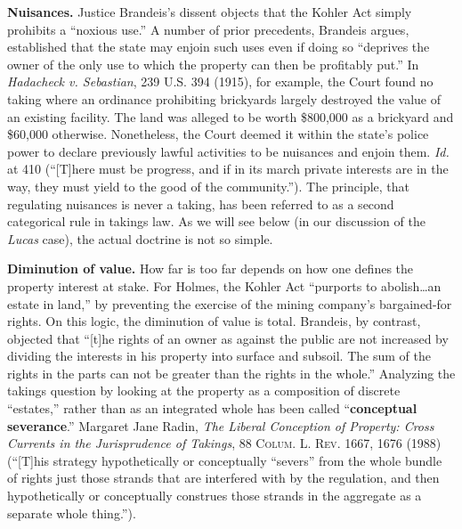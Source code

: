 
\item \textbf{Nuisances.} Justice Brandeis's dissent objects that the Kohler Act
simply prohibits a ``noxious use.'' A number of prior precedents, Brandeis
argues, established that the state may enjoin such uses even if doing so
``deprives the owner of the only use to which the property can then be
profitably put.'' In \textit{Hadacheck v. Sebastian}, 239 U.S. 394 (1915), for
example, the Court found no taking where an ordinance prohibiting brickyards
largely destroyed the value of an existing facility. The land was alleged to be
worth \$800,000 as a brickyard and \$60,000 otherwise. Nonetheless, the Court
deemed it within the state's police power to declare previously lawful
activities to be nuisances and enjoin them. \textit{Id.} at 410 (``[T]here must
be progress, and if in its march private interests are in the way, they must
yield to the good of the community.''). The principle, that regulating nuisances
is never a taking, has been referred to as a second categorical rule in takings
law. As we will see below (in our discussion of the \textit{Lucas} case), the
actual doctrine is not so simple.

\item \textbf{Diminution of value.} How far is too far depends on how one
defines the property interest at stake. For Holmes, the Kohler Act ``purports to
abolish\ldots an estate in land,'' by preventing the exercise of the mining
company's bargained-for rights. On this logic, the diminution of value is total.
Brandeis, by contrast, objected that ``[t]he rights of an owner as against the
public are not increased by dividing the interests in his property into surface
and subsoil. The sum of the rights in the parts can not be greater than the
rights in the whole.'' Analyzing the takings question by looking at the property
as a composition of discrete ``estates,'' rather than as an integrated whole has
been called ``\textbf{conceptual severance}.'' Margaret Jane Radin, \textit{The
Liberal Conception of Property: Cross Currents in the Jurisprudence of Takings},
88 \textsc{Colum. L. Rev}. 1667, 1676 (1988) (``[T]his strategy hypothetically
or conceptually ``severs'' from the whole bundle of rights just those strands
that are interfered with by the regulation, and then hypothetically or
conceptually construes those strands in the aggregate as a separate whole
thing.''). 


